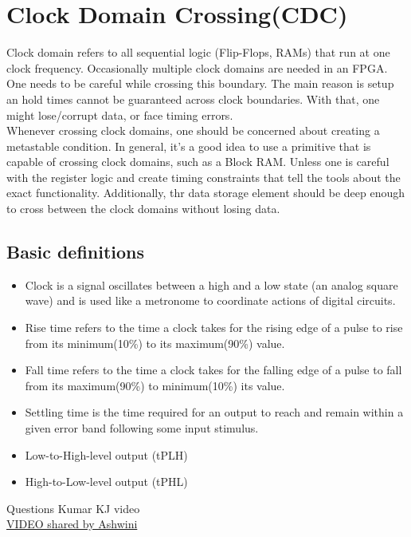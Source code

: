 \section{Clock Domain Crossing(CDC)}
Clock domain refers to all sequential logic (Flip-Flops, RAMs) that run at one clock frequency. Occasionally multiple clock domains are needed in an FPGA. One needs to be careful while crossing this boundary. The main reason is setup an hold times cannot be guaranteed across clock boundaries. With that, one might lose/corrupt data, or face timing errors.\\
Whenever crossing clock domains, one should be concerned about creating a metastable condition. In general, it's a good idea to use a primitive that is capable of crossing clock domains, such as a Block RAM. Unless one is careful with the register logic and create timing constraints that tell the tools about the exact functionality. Additionally, thr data storage element should be deep enough to cross between the clock domains without losing data. 

\subsection{Basic definitions}
\begin{itemize}
	\item Clock is a signal oscillates between a high and a low state (an analog square wave) and is used like a metronome to coordinate actions of digital circuits.
	\item Rise time refers to the time a clock takes for the rising edge of a pulse to rise from its minimum(10\%) to its maximum(90\%) value.
	\item Fall time refers to the time a clock takes for the falling edge of a pulse to fall from its maximum(90\%) to minimum(10\%) its value.
	\item Settling time is the time required for an output to reach and remain within a given error band following some input stimulus.
	\item Low-to-High-level output (tPLH)
	\item High-to-Low-level output (tPHL)
\end{itemize}




Questions Kumar KJ video\\
\href{https://web.microsoftstream.com/video/e25c7905-a2b7-4a78-a2f2-cbddc09c7e5d?channelId=eaf91042-11bc-4238-8425-dea0e029582d}{VIDEO shared by Ashwini}
 


